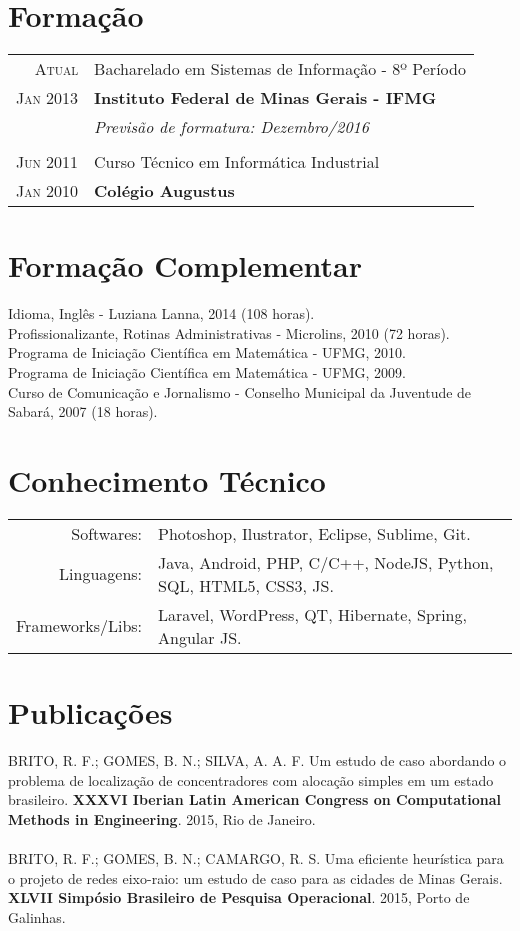 \documentclass[a4paper,10pt]{article}
\begin{document}
\section{Formação}
\begin{tabular}{r|p{13.1cm}}
	\textsc{Atual} & Bacharelado em Sistemas de Informação - 8º Período\\
	\textsc{Jan 2013} & \textbf{Instituto Federal de Minas Gerais - IFMG}\\
	&\small\emph{Previsão de formatura: Dezembro/2016}\\
	\multicolumn{2}{c}{} \\
	\textsc{Jun 2011}& Curso Técnico em Informática Industrial \\
	\textsc{Jan 2010}& \textbf{Colégio Augustus}
\end{tabular}

\section{Formação Complementar}
Idioma, Inglês - Luziana Lanna, \textsc{2014} (108 horas).\\
Profissionalizante, Rotinas Administrativas - Microlins, \textsc{2010} (72 horas).\\
Programa de Iniciação Científica em Matemática - UFMG, 2010.\\
Programa de Iniciação Científica em Matemática - UFMG, 2009.\\
Curso de Comunicação e Jornalismo - Conselho Municipal da Juventude de Sabará, 2007 (18 horas).

\section{Conhecimento Técnico}
\begin{tabular}{rl}
	Softwares: & Photoshop, Ilustrator, Eclipse, Sublime, Git.\\
	Linguagens: & Java, Android, PHP, C/C++, NodeJS, Python, SQL, HTML5, CSS3, JS.\\
	Frameworks/Libs: & Laravel, WordPress, QT, Hibernate, Spring, Angular JS.\\
\end{tabular}

\section{Publicações}
BRITO, R. F.; GOMES, B. N.; SILVA, A. A. F. Um estudo de caso abordando o problema de localização de concentradores com alocação simples em um estado brasileiro. \textbf{XXXVI Iberian Latin American Congress on Computational Methods in Engineering}. 2015, Rio de Janeiro.\\ \\
BRITO, R. F.; GOMES, B. N.; CAMARGO, R. S. Uma eficiente heurística para o projeto de redes eixo-raio: um estudo de caso para as cidades de Minas Gerais. \textbf{XLVII Simpósio Brasileiro de Pesquisa Operacional}. 2015, Porto de Galinhas.
\end{document}
